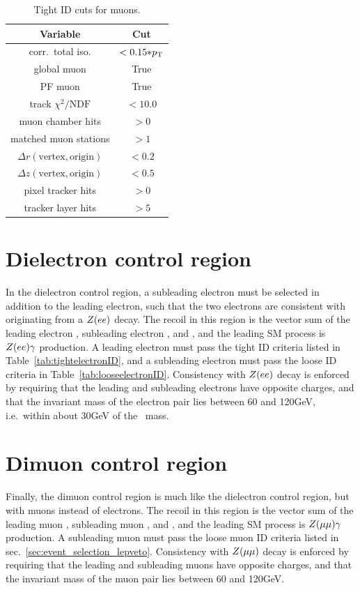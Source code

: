 \begin{table}
\centering
\begin{tabular}{ cc }
\hline
Variable & Cut \\
\hline
corr.\ total iso. & $< 0.15{*}p_\mathrm{T}$ \\
global muon & True \\
PF muon & True \\
track $\chi^{2}/\mathrm{NDF}$ & $< 10.0$ \\
muon chamber hits & $> 0$ \\
matched muon stations & $> 1$ \\
$\Delta r(\mathrm{vertex}, \mathrm{origin})$ & $< 0.2$ \\
$\Delta z(\mathrm{vertex}, \mathrm{origin})$ & $< 0.5$ \\
pixel tracker hits & $> 0$ \\
tracker layer hits & $> 5$ \\
\hline
\end{tabular}
\caption{Tight ID cuts for muons.}
\label{tab:tightmuonID}
\end{table}

\section{Dielectron control region} \label{sec:event_selection_diele}
In the dielectron control region, a subleading electron must be selected in addition to the leading electron, such that the two electrons
are consistent with originating from a $Z(ee)$ decay.
The recoil in this region is the vector sum of the leading electron \pT, subleading electron \pT, and \vecMET, and the leading SM process
is $Z(ee)\gamma$ production. A leading electron must pass the tight ID criteria listed in Table~\ref{tab:tightelectronID},
and a subleading electron must pass the loose ID criteria in Table~\ref{tab:looseelectronID}.
Consistency with $Z(ee)$ decay is enforced by requiring that the leading and subleading electrons have opposite charges, and that the invariant mass of the
electron pair lies between 60 and 120\unit{GeV}, i.e.\ within about 30\unit{GeV} of the \PZ\ mass.

\section{Dimuon control region} \label{sec:event_selection_dimu}
Finally, the dimuon control region is much like the dielectron control region, but with muons instead of electrons.
The recoil in this region is the vector sum of the leading muon \pT, subleading muon \pT, and \vecMET, and the leading SM process
is $Z(\mu\mu)\gamma$ production. A subleading muon must pass the loose muon ID criteria listed in sec.~\ref{sec:event_selection_lepveto}.
Consistency with $Z(\mu\mu)$ decay is enforced by requiring that the leading and subleading muons have opposite charges, and that the invariant mass of the
muon pair lies between 60 and 120\unit{GeV}.
